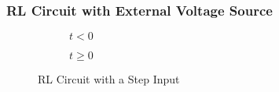 \documentclass[12pt]{article}
\begin{document}
\subsubsection{RL Circuit with External Voltage Source}
\label{sssec:rlCircuitWithExternalSource}

\begin{wrapfigure}[12]{r}{0.5\textwidth}
  \vspace{-15pt}
  \centering
  \begin{subfigure}[b]{0.2\textwidth}
    \centering
    
    \caption{$t<0$}
    \label{fig:030}
  \end{subfigure}
  \begin{subfigure}[b]{0.2\textwidth}
    \centering
    
    \caption{$t\geq0$}
    \label{fig:031}
  \end{subfigure}
  \caption{RL Circuit with a Step Input}
  \label{fig:rlCircuitWithAStepInput}
\end{wrapfigure}
\end{document}
